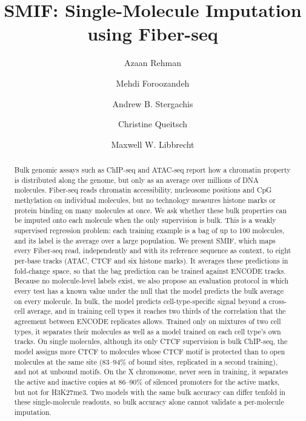 \documentclass[acmtog,nonacm]{acmart}   %
\begin{document}
\title{SMIF: Single-Molecule Imputation using Fiber-seq}

\author{Azaan Rehman}
\correspondingauthor
{}

\author{Mehdi Foroozandeh}

\author{Andrew B. Stergachis}

\author{Christine Queitsch}

\author{Maxwell W. Libbrecht}

\renewcommand{\shortauthors}{Rehman et al.}

\begin{abstract}
Bulk genomic assays such as ChIP-seq and ATAC-seq report how a chromatin property is distributed along the
genome, but only as an average over millions of DNA molecules. Fiber-seq reads chromatin accessibility,
nucleosome positions and CpG methylation on individual molecules, but no technology measures histone marks or
protein binding on many molecules at once. We ask whether these bulk properties can be imputed onto each molecule
when the only supervision is bulk. This is a weakly supervised regression problem: each training example is a bag
of up to 100 molecules, and its label is the average over a large population. We present SMIF, which maps
every Fiber-seq read, independently and with its reference sequence as context, to eight per-base tracks (ATAC,
CTCF and six histone marks). It averages these predictions in fold-change space, so that the bag prediction can be
trained against ENCODE tracks. Because no molecule-level labels exist, we also propose an evaluation protocol in
which every test has a known value under the null that the model predicts the bulk average on every molecule. In
bulk, the model predicts cell-type-specific signal beyond a cross-cell average, and in training cell types it
reaches two thirds of the correlation that the agreement between ENCODE replicates allows. Trained only on
mixtures of two cell types, it separates their molecules as well as a model trained on each cell type's own
tracks. On single molecules, although its only CTCF supervision is bulk ChIP-seq, the model assigns more CTCF to
molecules whose CTCF motif is protected than to open molecules at the same site (83--94\% of bound sites,
replicated in a second training), and not at unbound motifs. On the X chromosome, never seen in training, it
separates the active and inactive copies at 86--90\% of silenced promoters for the active marks, but not for
H3K27me3. Two models with the same bulk accuracy can differ tenfold in these single-molecule readouts, so bulk
accuracy alone cannot validate a per-molecule imputation.
\end{abstract}
\end{document}
